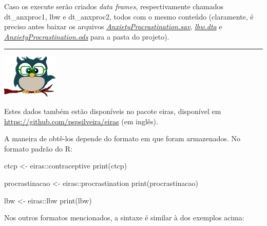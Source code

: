 \documentclass[
]{article}
\newenvironment{Shaded}{\begin{snugshade}}{\end{snugshade}}
\newcommand{\FunctionTok}[1]{\textcolor[rgb]{0.00,0.00,0.00}{#1}}
\newcommand{\NormalTok}[1]{#1}
\newcommand{\OtherTok}[1]{\textcolor[rgb]{0.56,0.35,0.01}{#1}}
\newcommand{\SpecialCharTok}[1]{\textcolor[rgb]{0.00,0.00,0.00}{#1}}
\begin{document}
Caso os execute serão criados \emph{data frames}, respectivamente
chamados dt\_anxproc1, lbw e dt\_anxproc2, todos com o mesmo conteúdo
(claramente, é preciso antes baixar os arquivos
\emph{\url{AnxietyProcrastination.sav}}, \emph{\url{lbw.dta}} e
\emph{\url{AnxietyProcrastination.ods}} para a pasta do projeto).

\begin{center}\rule{0.5\linewidth}{0.5pt}\end{center}

\begin{flushleft}\includegraphics[width=0.08\linewidth]{coruja} \end{flushleft}

Estes dados também estão disponíveis no pacote eiras, disponível em
\url{https://github.com/pspsilveira/eiras} (em inglês).

A maneira de obtê-los depende do formato em que foram armazenados. No
formato padrão do R:

\begin{Shaded}
\begin{Highlighting}[]
\NormalTok{ctcp }\OtherTok{\textless{}{-}}\NormalTok{ eiras}\SpecialCharTok{::}\NormalTok{contraceptive}
\FunctionTok{print}\NormalTok{(ctcp)}

\NormalTok{procrastinacao }\OtherTok{\textless{}{-}}\NormalTok{ eiras}\SpecialCharTok{::}\NormalTok{procrastination}
\FunctionTok{print}\NormalTok{(procrastinacao)}

\NormalTok{lbw }\OtherTok{\textless{}{-}}\NormalTok{ eiras}\SpecialCharTok{::}\NormalTok{lbw}
\FunctionTok{print}\NormalTok{(lbw)}
\end{Highlighting}
\end{Shaded}

Nos outros formatos mencionados, a sintaxe é similar à dos exemplos
acima:
\end{document}
